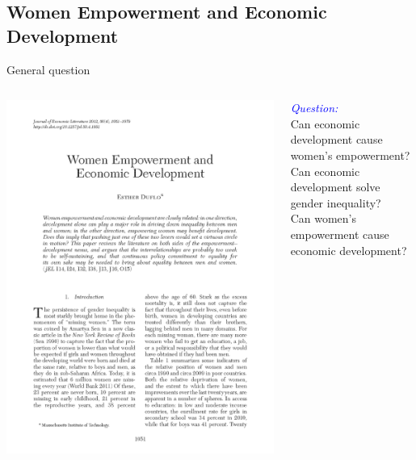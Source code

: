 \documentclass[xcolor=dvipsnames, t]{beamer}
\begin{document}
	\subsection{Women Empowerment and Economic Development}
	\begin{frame}[fragile]{General question}
		\begin{columns}[T]
			\begin{column}{0.4\textwidth}
				\includegraphics[width=0.8\linewidth]{duflo.png}
			\end{column}
			\begin{column}{0.56\textwidth}
				\begin{center}
					\textit{\textcolor{blue}{Question:}}\\ \pause
					\bigskip		
					Can economic development cause women's empowerment?\\ \pause
					\bigskip		
					Can economic development solve gender inequality?\\ \pause
					\bigskip
					Can women's empowerment cause economic development?
				\end{center}
			\end{column}
		\end{columns}
	\end{frame}
	
\end{document}
